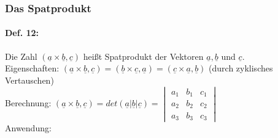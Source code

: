 \subsubsection{Das Spatprodukt}
\paragraph{Def. 12:} \parskp
Die Zahl $(\underline{a} \times \underline{b}, \underline{c})$ heißt Spatprodukt der Vektoren $\underline{a}, \underline{b}$ und $\underline{c}$.\\
Eigenschaften: 
$(\underline{a} \times \underline{b},\underline{c})=(\underline{b} \times \underline{c}, \underline{a})=(\underline{c}\times \underline{a}, \underline{b})$ (durch zyklisches Vertauschen)\\
Berechnung: $\boxed{(\underline{a} \times \underline{b}, \underline{c})= det(\underline{a} |\underline{b}|\underline{c})= \begin{vmatrix}
a_1 & b_1 & c_1\\
a_2 & b_2 & c_2\\
a_3 & b_3 & c_3
\end{vmatrix}}$\\
Anwendung: 
